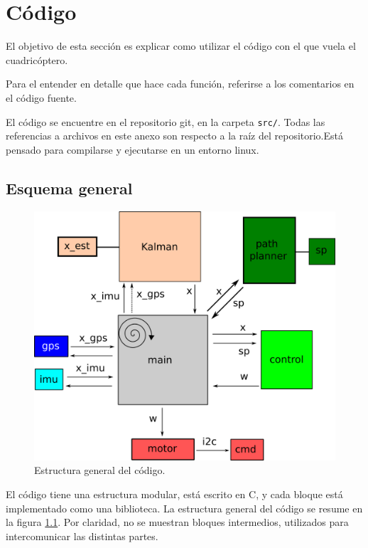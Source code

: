 \documentclass[main]{subfiles}
\begin{document}
\chapter{Código}
\label{chap:codigo}

El objetivo de esta sección es explicar como utilizar el código con el que vuela el cuadricóptero.

Para el entender en detalle que hace cada función, referirse a los comentarios en el código fuente.

El código se encuentre en el repositorio git, en la carpeta \verb+src/+. Todas las referencias a archivos en este anexo son respecto a la raíz del repositorio.Está pensado para compilarse y ejecutarse en un entorno linux.

\section{Esquema general}
\label{sec:codigo:esquema-general}

\begin{figure}
\vspace{-20pt}
\centering
  \includegraphics{./pics_codigo/code.png}
\caption{Estructura general del código.}
\vspace{-20pt}
\label{fig:codigo:code.png}
\end{figure}

El código tiene una estructura modular, está escrito en C, y cada bloque está implementado como una biblioteca. La estructura general del código se resume en la figura \ref{fig:codigo:code.png}. Por claridad, no se muestran bloques intermedios, utilizados para intercomunicar las distintas partes.
\end{document}
